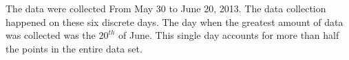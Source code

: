 
The data were collected From May 30 to June 20, 2013. The data collection happened on these six discrete days. The day when the greatest amount of data was collected was the $20^{th}$ of June. This single day accounts for more than half the points in the entire data set.




